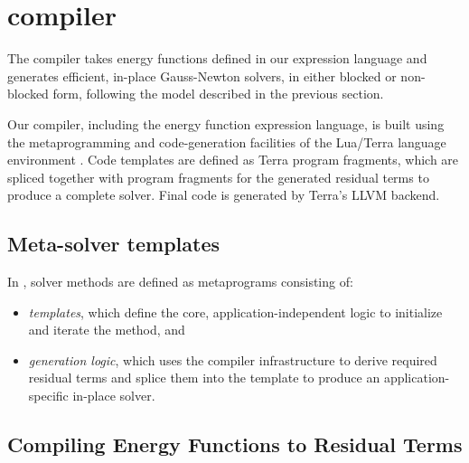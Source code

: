 \section{compiler}
\label{sec:compiler}


The \OPT{} compiler takes energy functions defined in our expression language and generates efficient, in-place Gauss-Newton solvers, in either blocked or non-blocked form, following the model described in the previous section.

Our compiler, including the energy function expression language, is built using the metaprogramming and code-generation facilities of the Lua/Terra language environment \cite{terra}. Code templates are defined as Terra program fragments, which are spliced together with program fragments for the generated residual terms to produce a complete solver. Final code is generated by Terra's LLVM backend.

\subsection{Meta-solver templates} %
\label{sub:solver_templates}
In \OPT, solver methods are defined as metaprograms consisting of:

\begin{itemize}
  \item \emph{templates}, which define the core, application-independent logic to initialize and iterate the method, and
  \item \emph{generation logic}, which uses the compiler infrastructure to derive required residual terms and splice them into the template to produce an application-specific in-place solver.
\end{itemize}



\subsection{Compiling Energy Functions to Residual Terms} %
\label{sec:compiling_residuals}

